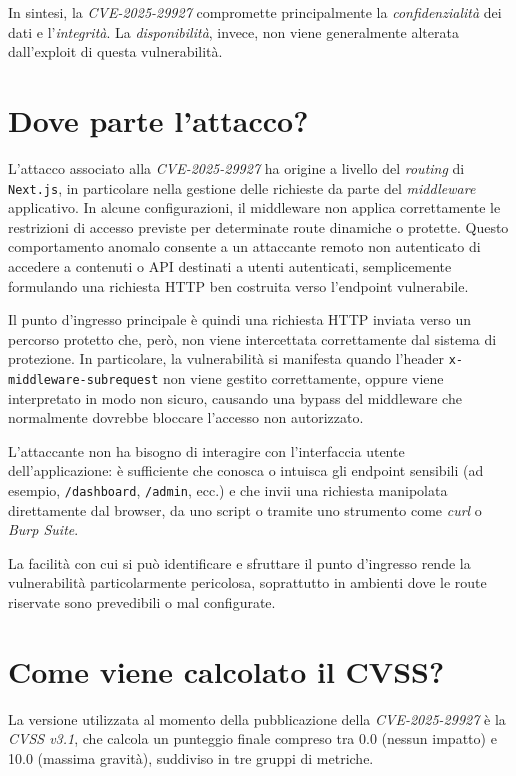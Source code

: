 \documentclass[a4paper,oneside,12pt]{report}
\begin{document}
In sintesi, la \emph{CVE-2025-29927} compromette principalmente la \emph{confidenzialità} dei dati e l’\emph{integrità}. La \emph{disponibilità}, invece, non viene generalmente alterata dall’exploit di questa vulnerabilità.

\section{Dove parte l'attacco?}
\label{sec:dove-parte-attacco}

L'attacco associato alla \emph{CVE-2025-29927} ha origine a livello del \emph{routing} di \texttt{Next.js}, in particolare nella gestione delle richieste da parte del \emph{middleware} applicativo. In alcune configurazioni, il middleware non applica correttamente le restrizioni di accesso previste per determinate route dinamiche o protette. Questo comportamento anomalo consente a un attaccante remoto non autenticato di accedere a contenuti o API destinati a utenti autenticati, semplicemente formulando una richiesta HTTP ben costruita verso l’endpoint vulnerabile.

Il punto d’ingresso principale è quindi una richiesta HTTP inviata verso un percorso protetto che, però, non viene intercettata correttamente dal sistema di protezione. In particolare, la vulnerabilità si manifesta quando l’header \texttt{x-middleware-subrequest} non viene gestito correttamente, oppure viene interpretato in modo non sicuro, causando una bypass del middleware che normalmente dovrebbe bloccare l’accesso non autorizzato.

L’attaccante non ha bisogno di interagire con l’interfaccia utente dell’applicazione: è sufficiente che conosca o intuisca gli endpoint sensibili (ad esempio, \texttt{/dashboard}, \texttt{/admin}, ecc.) e che invii una richiesta manipolata direttamente dal browser, da uno script o tramite uno strumento come \textit{curl} o \textit{Burp Suite}.

La facilità con cui si può identificare e sfruttare il punto d’ingresso rende la vulnerabilità particolarmente pericolosa, soprattutto in ambienti dove le route riservate sono prevedibili o mal configurate.

\section{Come viene calcolato il CVSS?}
\label{sec:come-viene-calcolato-cvss}

La versione utilizzata al momento della pubblicazione della \emph{CVE-2025-29927} è la \emph{CVSS v3.1}, che calcola un punteggio finale compreso tra 0.0 (nessun impatto) e 10.0 (massima gravità), suddiviso in tre gruppi di metriche.
\end{document}

